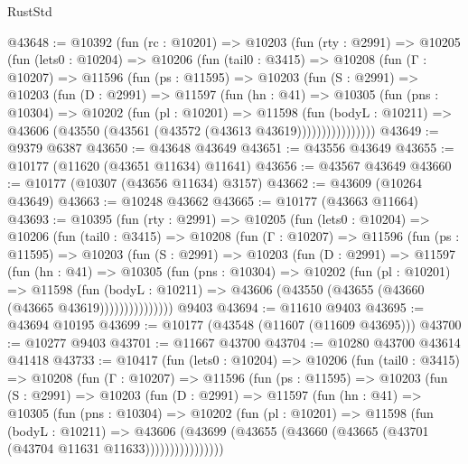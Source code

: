 \begin{lexlean}{RustStd}
\begin{coremodule}
@43648 := @10392
    (fun (rc : @10201) =>
    @10203
      (fun (rty : @2991) =>
      @10205
        (fun (lets0 : @10204) =>
        @10206
          (fun (tail0 : @3415) =>
          @10208
            (fun (Γ : @10207) =>
            @11596
              (fun (ps : @11595) =>
              @10203
                (fun (S : @2991) =>
                @10203
                  (fun (D : @2991) =>
                  @11597
                    (fun (hn : @41) =>
                    @10305
                      (fun (pns : @10304) =>
                      @10202
                        (fun (pl : @10201) =>
                        @11598
                          (fun (bodyL : @10211) =>
                          @43606 (@43550 (@43561 (@43572 (@43613 @43619))))))))))))))))
@43649 := @9379 @6387
@43650 := @43648 @43649
@43651 := @43556 @43649
@43655 := @10177 (@11620 (@43651 @11634) @11641)
@43656 := @43567 @43649
@43660 := @10177 (@10307 (@43656 @11634) @3157)
@43662 := @43609 (@10264 @43649)
@43663 := @10248 @43662
@43665 := @10177 (@43663 @11664)
@43693 := @10395
    (fun (rty : @2991) =>
    @10205
      (fun (lets0 : @10204) =>
      @10206
        (fun (tail0 : @3415) =>
        @10208
          (fun (Γ : @10207) =>
          @11596
            (fun (ps : @11595) =>
            @10203
              (fun (S : @2991) =>
              @10203
                (fun (D : @2991) =>
                @11597
                  (fun (hn : @41) =>
                  @10305
                    (fun (pns : @10304) =>
                    @10202
                      (fun (pl : @10201) =>
                      @11598
                        (fun (bodyL : @10211) =>
                        @43606 (@43550 (@43655 (@43660 (@43665 @43619)))))))))))))))
    @9403
@43694 := @11610 @9403
@43695 := @43694 @10195
@43699 := @10177 (@43548 (@11607 (@11609 @43695)))
@43700 := @10277 @9403
@43701 := @11667 @43700
@43704 := @10280 @43700 @43614 @41418
@43733 := @10417
    (fun (lets0 : @10204) =>
    @10206
      (fun (tail0 : @3415) =>
      @10208
        (fun (Γ : @10207) =>
        @11596
          (fun (ps : @11595) =>
          @10203
            (fun (S : @2991) =>
            @10203
              (fun (D : @2991) =>
              @11597
                (fun (hn : @41) =>
                @10305
                  (fun (pns : @10304) =>
                  @10202
                    (fun (pl : @10201) =>
                    @11598
                      (fun (bodyL : @10211) =>
                      @43606
                        (@43699
                          (@43655 (@43660 (@43665 (@43701 (@43704 @11631 @11633))))))))))))))))

\end{coremodule}
\end{lexlean}
